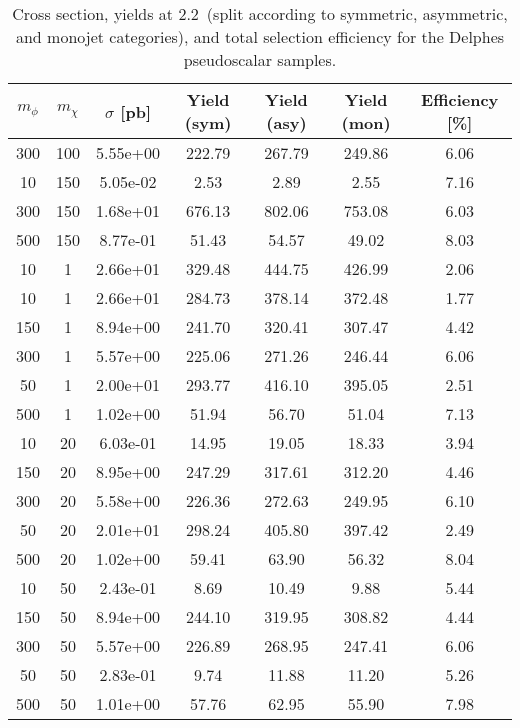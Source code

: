 \begin{table}
\footnotesize
\centering
\begin{tabular}{ccccccc}
\hline\hline
$m_\phi$ & $m_\chi$ & $\sigma$ [pb] & Yield (sym) & Yield (asy) & Yield (mon) & Efficiency [\%] \\ \hline
300       &   100       &   5.55e+00  &   222.79    &   267.79    &   249.86    &   6.06      \\ 
10        &   150       &   5.05e-02  &   2.53      &   2.89      &   2.55      &   7.16      \\ 
300       &   150       &   1.68e+01  &   676.13    &   802.06    &   753.08    &   6.03      \\ 
500       &   150       &   8.77e-01  &   51.43     &   54.57     &   49.02     &   8.03      \\ 
10        &   1         &   2.66e+01  &   329.48    &   444.75    &   426.99    &   2.06      \\ 
10        &   1         &   2.66e+01  &   284.73    &   378.14    &   372.48    &   1.77      \\ 
150       &   1         &   8.94e+00  &   241.70    &   320.41    &   307.47    &   4.42      \\ 
300       &   1         &   5.57e+00  &   225.06    &   271.26    &   246.44    &   6.06      \\ 
50        &   1         &   2.00e+01  &   293.77    &   416.10    &   395.05    &   2.51      \\ 
500       &   1         &   1.02e+00  &   51.94     &   56.70     &   51.04     &   7.13      \\ 
10        &   20        &   6.03e-01  &   14.95     &   19.05     &   18.33     &   3.94      \\ 
150       &   20        &   8.95e+00  &   247.29    &   317.61    &   312.20    &   4.46      \\ 
300       &   20        &   5.58e+00  &   226.36    &   272.63    &   249.95    &   6.10      \\ 
50        &   20        &   2.01e+01  &   298.24    &   405.80    &   397.42    &   2.49      \\ 
500       &   20        &   1.02e+00  &   59.41     &   63.90     &   56.32     &   8.04      \\ 
10        &   50        &   2.43e-01  &   8.69      &   10.49     &   9.88      &   5.44      \\ 
150       &   50        &   8.94e+00  &   244.10    &   319.95    &   308.82    &   4.44      \\ 
300       &   50        &   5.57e+00  &   226.89    &   268.95    &   247.41    &   6.06      \\ 
50        &   50        &   2.83e-01  &   9.74      &   11.88     &   11.20     &   5.26      \\ 
500       &   50        &   1.01e+00  &   57.76     &   62.95     &   55.90     &   7.98      \\ 
\hline\hline
\end{tabular}
\caption{Cross section, yields at 2.2~\ifb (split according to symmetric, asymmetric, and monojet categories), and total selection efficiency for the Delphes pseudoscalar samples.}
\label{tab:summmary_ScorpionDMP}
\end{table}
